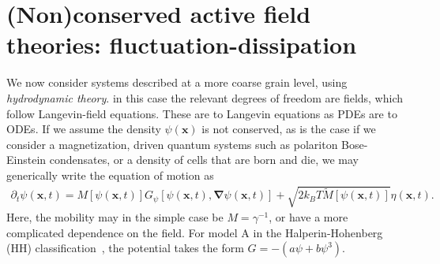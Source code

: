 \section{(Non)conserved active field theories: fluctuation-dissipation}



We now consider systems described at a more coarse grain level, using \emph{hydrodynamic theory}. 
in this case the relevant degrees of freedom are fields, which follow Langevin-field equations.
These are to Langevin equations as PDEs are to ODEs.
If we assume the density $\psi(\bm x)$ is not conserved, as is the case if we consider a magnetization, driven quantum systems such as polariton Bose-Einstein condensates, or a density of cells that are born and die, we may generically write the equation of motion as
%
\begin{align}
    \partial_t \psi(\bm x, t) 
    = M[\psi(\bm x, t)] G_\psi[\psi(\bm x, t), \bm \nabla \psi(\bm x, t)] 
    + \sqrt{ 2 k_B T \tilde M[\psi(\bm x, t)] } \eta(\bm x, t).
\end{align}
%
Here, the mobility may in the simple case be $M = \gamma^{-1}$, or have a more complicated dependence on the field.
For model A in the Halperin-Hohenberg (HH) classification~\cite{HohenbergRMP}, the potential takes the form $G = -(a \psi + b \psi^3)$. 

